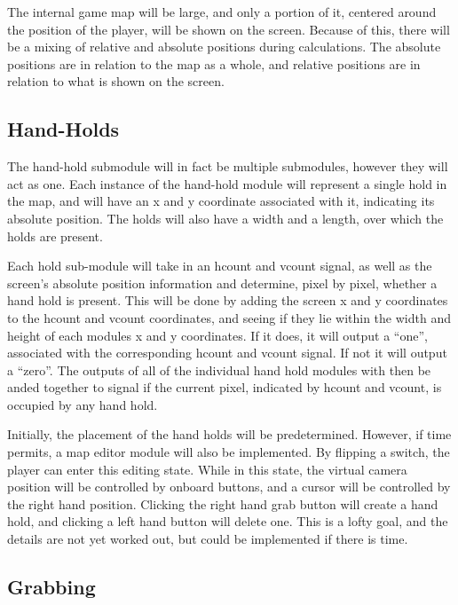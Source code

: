 The internal game map will be large, and only a portion of it, centered around the position of the player, will be shown on the screen. Because of this, there will be a mixing of relative and absolute positions during calculations. The absolute positions are in relation to the map as a whole, and relative positions are in relation to what is shown on the screen. 

\subsection{Hand-Holds}

The hand-hold submodule will in fact be multiple submodules, however they will act as one. Each instance of the hand-hold module will represent a single hold in the map, and will have an x and y coordinate associated with it, indicating its absolute position. The holds will also have a width and a length, over which the holds are present. 

Each hold sub-module will take in an hcount and vcount signal, as well as the screen's absolute position information and determine, pixel by pixel, whether a hand hold is present. This will be done by adding the screen x and y coordinates to the hcount and vcount coordinates, and seeing if they lie within the width and height of each modules x and y coordinates. If it does, it will output a “one”, associated with the corresponding hcount and vcount signal. If not it will output a “zero”. The outputs of all of the individual hand hold modules with then be anded together to signal if the current pixel, indicated by hcount and vcount, is occupied by any hand hold. 

Initially, the placement of the hand holds will be predetermined. However, if time permits, a map editor module will also be implemented. By flipping a switch, the player can enter this editing state. While in this state, the virtual camera position will be controlled by onboard buttons, and a cursor will be controlled by the right hand position. Clicking the right hand grab button will create a hand hold, and clicking a left hand button will delete one. This is a lofty goal, and the details are not yet worked out, but could be implemented if there is time. 

\subsection{Grabbing}


